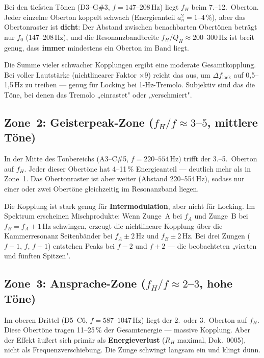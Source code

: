 \documentclass[11pt,a4paper]{article}
\begin{document}
Bei den tiefsten Tönen (D3--G\#3, $f = 147$--$208$\,Hz) liegt $f_H$ beim 7.--12.~Oberton. Jeder einzelne Oberton koppelt schwach (Energieanteil $a_n^2 = 1$--$4\,\%$), aber das Obertonraster ist \textbf{dicht}: Der Abstand zwischen benachbarten Obertönen beträgt nur $f_0$ (147--208\,Hz), und die Resonanzbandbreite $f_H/Q_H \approx 200$--$300$\,Hz ist breit genug, dass \textbf{immer} mindestens ein Oberton im Band liegt.

Die Summe vieler schwacher Kopplungen ergibt eine moderate Gesamtkopplung. Bei voller Lautstärke (nichtlinearer Faktor $\times 9$) reicht das aus, um $\Delta f_\text{lock}$ auf 0,5--1,5\,Hz zu treiben --- genug für Locking bei 1-Hz-Tremolo. Subjektiv sind das die Töne, bei denen das Tremolo „einrastet" oder „verschmiert".

\subsection{\textcolor{zone2orange}{Zone~2: Geisterpeak-Zone ($f_H/f \approx 3$--$5$, mittlere Töne)}}

In der Mitte des Tonbereichs (A3--C\#5, $f = 220$--$554$\,Hz) trifft der 3.--5.~Oberton auf $f_H$. Jeder dieser Obertöne hat 4--11\,\% Energieanteil --- deutlich mehr als in Zone~1. Das Obertonraster ist aber weiter (Abstand 220--554\,Hz), sodass nur einer oder zwei Obertöne gleichzeitig im Resonanzband liegen.

Die Kopplung ist stark genug für \textbf{Intermodulation}, aber nicht für Locking. Im Spektrum erscheinen Mischprodukte: Wenn Zunge~A bei $f_A$ und Zunge~B bei $f_B = f_A + 1$\,Hz schwingen, erzeugt die nichtlineare Kopplung über die Kammerresonanz Seitenbänder bei $f_A \pm 2$\,Hz und $f_B \pm 2$\,Hz. Bei drei Zungen ($f-1$, $f$, $f+1$) entstehen Peaks bei $f-2$ und $f+2$ --- die beobachteten „vierten und fünften Spitzen".

\subsection{\textcolor{zone3red}{Zone~3: Ansprache-Zone ($f_H/f \approx 2$--$3$, hohe Töne)}}

Im oberen Drittel (D5--C6, $f = 587$--$1047$\,Hz) liegt der 2.\ oder 3.~Oberton auf $f_H$. Diese Obertöne tragen 11--25\,\% der Gesamtenergie --- massive Kopplung. Aber der Effekt äußert sich primär als \textbf{Energieverlust} ($R_H$ maximal, Dok.~0005), nicht als Frequenzverschiebung. Die Zunge schwingt langsam ein und klingt dünn.
\end{document}
